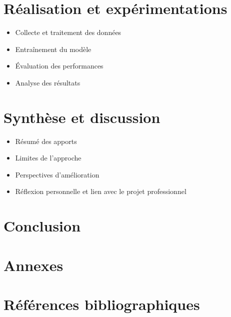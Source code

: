 \documentclass[12pt,a4paper]{article}
\begin{document}
\section{Réalisation et expérimentations}
\begin{itemize}
    \item Collecte et traitement des données
    \item Entraînement du modèle
    \item Évaluation des performances
    \item Analyse des résultats
\end{itemize}

\section{Synthèse et discussion}
\begin{itemize}
    \item Résumé des apports
    \item Limites de l'approche
    \item Perspectives d'amélioration
    \item Réflexion personnelle et lien avec le projet professionnel
\end{itemize}

\section{Conclusion}

\section*{Annexes}

\section*{Références bibliographiques}
\end{document}
